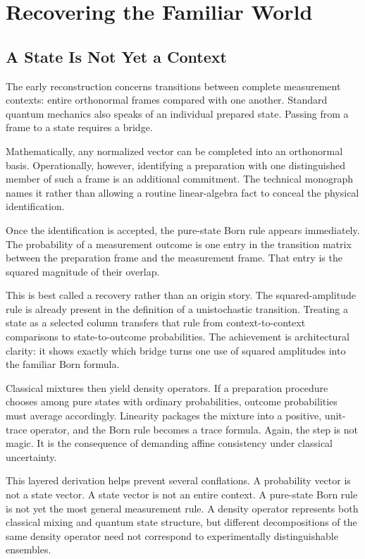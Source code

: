 \documentclass[12pt,openany]{book}
\begin{document}
\part{Recovering the Familiar World}

\chapter{A State Is Not Yet a Context}
The early reconstruction concerns transitions between complete measurement contexts: entire orthonormal frames compared with one another. Standard quantum mechanics also speaks of an individual prepared state. Passing from a frame to a state requires a bridge.

Mathematically, any normalized vector can be completed into an orthonormal basis. Operationally, however, identifying a preparation with one distinguished member of such a frame is an additional commitment. The technical monograph names it rather than allowing a routine linear-algebra fact to conceal the physical identification.

Once the identification is accepted, the pure-state Born rule appears immediately. The probability of a measurement outcome is one entry in the transition matrix between the preparation frame and the measurement frame. That entry is the squared magnitude of their overlap.

This is best called a recovery rather than an origin story. The squared-amplitude rule is already present in the definition of a unistochastic transition. Treating a state as a selected column transfers that rule from context-to-context comparisons to state-to-outcome probabilities. The achievement is architectural clarity: it shows exactly which bridge turns one use of squared amplitudes into the familiar Born formula.

Classical mixtures then yield density operators. If a preparation procedure chooses among pure states with ordinary probabilities, outcome probabilities must average accordingly. Linearity packages the mixture into a positive, unit-trace operator, and the Born rule becomes a trace formula. Again, the step is not magic. It is the consequence of demanding affine consistency under classical uncertainty.

This layered derivation helps prevent several conflations. A probability vector is not a state vector. A state vector is not an entire context. A pure-state Born rule is not yet the most general measurement rule. A density operator represents both classical mixing and quantum state structure, but different decompositions of the same density operator need not correspond to experimentally distinguishable ensembles.
\end{document}
